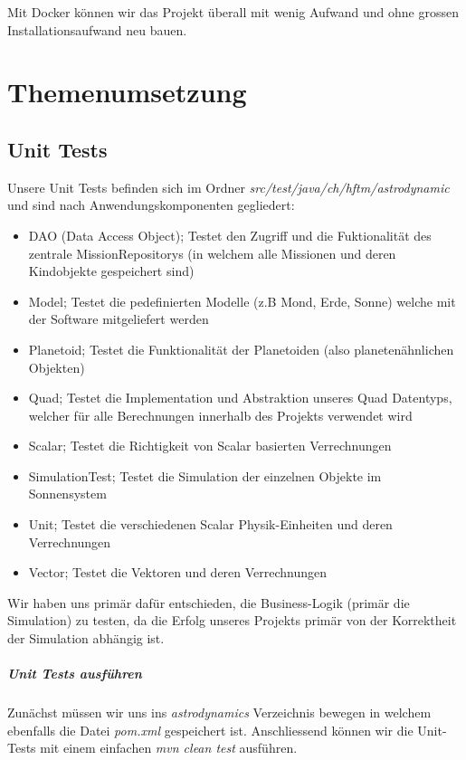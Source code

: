 Mit Docker können wir das Projekt überall mit wenig Aufwand und ohne grossen Installationsaufwand neu bauen.

\section{Themenumsetzung}

\subsection{Unit Tests}

Unsere Unit Tests befinden sich im Ordner \textit{src/test/java/ch/hftm/astrodynamic} und sind nach Anwendungskomponenten gegliedert:

\begin{itemize}
	\item DAO (Data Access Object); Testet den Zugriff und die Fuktionalität des zentrale MissionRepositorys (in welchem alle Missionen und deren Kindobjekte gespeichert sind)
	\item Model; Testet die pedefinierten Modelle (z.B Mond, Erde, Sonne) welche mit der Software mitgeliefert werden
	\item Planetoid; Testet die Funktionalität der Planetoiden (also planetenähnlichen Objekten)
	\item Quad; Testet die Implementation und Abstraktion unseres Quad Datentyps, welcher für alle Berechnungen innerhalb des Projekts verwendet wird
	\item Scalar; Testet die Richtigkeit von Scalar basierten Verrechnungen
	\item SimulationTest; Testet die Simulation der einzelnen Objekte im Sonnensystem
	\item Unit; Testet die verschiedenen Scalar Physik-Einheiten und deren Verrechnungen
	\item Vector; Testet die Vektoren und deren Verrechnungen
\end{itemize}

Wir haben uns primär dafür entschieden, die Business-Logik (primär die Simulation) zu testen, da die Erfolg unseres Projekts primär von der Korrektheit der Simulation abhängig ist.

\subparagraph{Unit Tests ausführen}

Zunächst müssen wir uns ins \textit{astrodynamics} Verzeichnis bewegen in welchem ebenfalls die Datei \textit{pom.xml} gespeichert ist.
Anschliessend können wir die Unit-Tests mit einem einfachen \textit{mvn clean test} ausführen.

